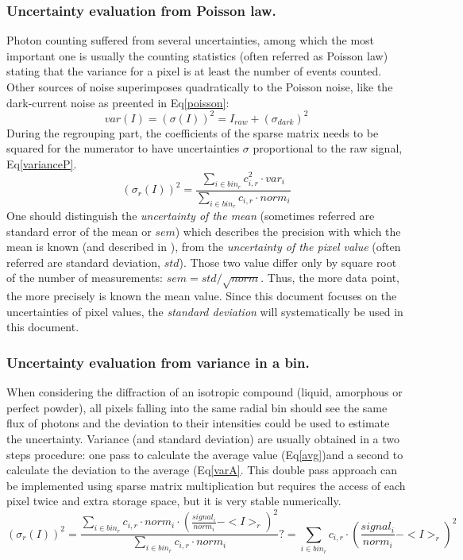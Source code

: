 \documentclass[preprint]{iucr}              %
\begin{document}
\subsubsection{Uncertainty evaluation from Poisson law.}
Photon counting suffered from several uncertainties, among which the most important one is usually the counting statistics (often referred as Poisson law)
stating that the variance for a pixel is at least the number of events counted.
Other sources of noise superimposes quadratically to the Poisson noise, like the dark-current noise as preented in Eq\ref{poisson}:     
\begin{equation}
\label{poisson}
var(I) = (\sigma(I))^{2} = I_{raw} + (\sigma_{dark})^{2}  
\end{equation}
During the regrouping part, the coefficients of the sparse matrix needs to be squared for the numerator to have uncertainties $\sigma$ proportional to the raw signal, Eq\ref{varianceP}.
\begin{equation}
\label{varianceP}
(\sigma_{r}(I))^2 = \frac{\sum\limits_{i \in bin_r} c_{i,r}^2 \cdot var_i}
                  {\sum\limits_{i \in bin_r} c_{i,r} \cdot norm_i} 
\end{equation}
One should distinguish the \textit{uncertainty of the mean} (sometimes referred are standard error of the mean or $sem$) 
which describes the precision with which the mean is known (and described in \cite{pyfai_2020}),
from the \textit{uncertainty of the pixel value} (often referred are standard deviation, $std$). 
Those two value differ only by square root of the number of measurements: $sem = std/\sqrt{norm}$.
Thus, the more data point, the more precisely is known the mean value.
Since this document focuses on the uncertainties of pixel values, the \textit{standard deviation} will systematically be used in this document.  

\subsubsection{Uncertainty evaluation from variance in a bin.}
When considering the diffraction of an isotropic compound (liquid, amorphous or perfect powder), all pixels falling into the same radial bin should see the same flux of photons and the deviation to their intensities could be used to estimate the uncertainty.
Variance (and standard deviation) are usually obtained in a two steps procedure: one pass to calculate the average value (Eq\ref{avg})and a second to calculate the deviation to the average (Eq\ref{varA}. 
This double pass approach can be implemented using sparse matrix multiplication but requires the access of each pixel twice and extra storage space, but it is very stable numerically.
\begin{equation}
\label{varA}
(\sigma_{r}(I))^2 = \frac{\sum\limits_{i \in bin_r} c_{i,r} \cdot norm_i \cdot (\frac{signal_i}{norm_i}-<I>_r)^2}
                         {\sum\limits_{i \in bin_r} c_{i,r} \cdot norm_i}  ?=  \sum\limits_{i \in bin_r} c_{i,r} \cdot  (\frac{signal_i}{norm_i}-<I>_r)^2
\end{equation}
\end{document}
